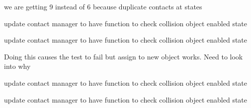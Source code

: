 \begin{DoxyRefList}
\label{todo__todo000012}%
%
we are getting 9 instead of 6 because duplicate contacts at states  
\item[Member \mbox{\hyperlink{tesseract__environment__unit_8cpp_ac000b39be53683eced961b8e905d5050}{TEST}} (Tesseract\+Environment\+Unit, Env\+Set\+Active\+Discrete\+Contact\+Manager\+Command\+Unit)]\label{todo__todo000011}%
%
update contact manager to have function to check collision object enabled state  
\item[Member \mbox{\hyperlink{tesseract__environment__unit_8cpp_a48e8ba4aff90b6492e3905dc3d9a2686}{TEST}} (Tesseract\+Environment\+Unit, Env\+Set\+Active\+Continuous\+Contact\+Manager\+Command\+Unit)]\label{todo__todo000010}%
%
update contact manager to have function to check collision object enabled state  
\item[Member \mbox{\hyperlink{tesseract__scene__graph__unit_8cpp_a07e5d7fb0413d0780df4b637bcd35845}{TEST}} (Tesseract\+Scene\+Graph\+Unit, Tesseract\+Scene\+Graph\+Remove\+Link\+Unit)]\label{todo__todo000024}%
%
Doing this causes the test to fail but assign to new object works. Need to look into why  
\item[Member \mbox{\hyperlink{tesseract__environment__unit_8cpp_aa8be7c5729a18846a93f15be668f8d93}{TEST}} (Tesseract\+Environment\+Unit, Env\+Change\+Link\+Visibility\+Command\+Unit)]\label{todo__todo000009}%
%
update contact manager to have function to check collision object enabled state  
\item[Member \mbox{\hyperlink{tesseract__environment__unit_8cpp_a0885de2a8da955b4bb9b9be73de49350}{TEST}} (Tesseract\+Environment\+Unit, Env\+Change\+Link\+Collision\+Enabled\+Command\+Unit)]\label{todo__todo000008}%
%
update contact manager to have function to check collision object enabled state 
\end{DoxyRefList}